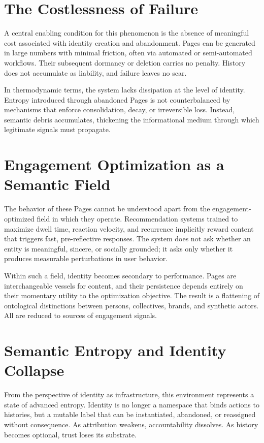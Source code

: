 \documentclass[11pt,oneside]{article}
\begin{document}
\section{The Costlessness of Failure}

A central enabling condition for this phenomenon is the absence of meaningful cost associated with identity creation and abandonment. Pages can be generated in large numbers with minimal friction, often via automated or semi-automated workflows. Their subsequent dormancy or deletion carries no penalty. History does not accumulate as liability, and failure leaves no scar.

In thermodynamic terms, the system lacks dissipation at the level of identity. Entropy introduced through abandoned Pages is not counterbalanced by mechanisms that enforce consolidation, decay, or irreversible loss. Instead, semantic debris accumulates, thickening the informational medium through which legitimate signals must propagate.

\section{Engagement Optimization as a Semantic Field}

The behavior of these Pages cannot be understood apart from the engagement-optimized field in which they operate. Recommendation systems trained to maximize dwell time, reaction velocity, and recurrence implicitly reward content that triggers fast, pre-reflective responses. The system does not ask whether an entity is meaningful, sincere, or socially grounded; it asks only whether it produces measurable perturbations in user behavior.

Within such a field, identity becomes secondary to performance. Pages are interchangeable vessels for content, and their persistence depends entirely on their momentary utility to the optimization objective. The result is a flattening of ontological distinctions between persons, collectives, brands, and synthetic actors. All are reduced to sources of engagement signals.

\section{Semantic Entropy and Identity Collapse}

From the perspective of identity as infrastructure, this environment represents a state of advanced entropy. Identity is no longer a namespace that binds actions to histories, but a mutable label that can be instantiated, abandoned, or reassigned without consequence. As attribution weakens, accountability dissolves. As history becomes optional, trust loses its substrate.
\end{document}
